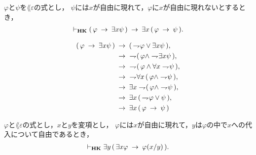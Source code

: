 	\begin{sketch}
		
	\end{sketch}
	
	\begin{screen}
		\begin{thm}
			$\varphi$と$\psi$を$\lang{\varepsilon}$の式とし，
			$\psi$には$x$が自由に現れて，$\varphi$に$x$が自由に現れないとするとき，
			\begin{align}
				\vdash_{{\scriptsize \mbox{{\bf HK}}}} (\, \varphi \hspace{0.25em}\rightarrow\hspace{0.25em} \exists x \psi\, )
				\hspace{0.25em}\rightarrow\hspace{0.25em} \exists x\, (\, \varphi \hspace{0.25em}\rightarrow\hspace{0.25em} \psi\, ).
			\end{align}
		\end{thm}
	\end{screen}
	
	\begin{sketch}
		\begin{align}
			(\, \varphi \rarrow \exists x \psi\, ) &\rarrow 
				(\, \negation \varphi \vee \exists x \psi\, ), \\
			&\rarrow\ \negation (\, \varphi \wedge \negation \exists x \psi\, ), \\
			&\rarrow\ \negation (\, \varphi \wedge \forall x \negation \psi\, ), \\
			&\rarrow\ \negation \forall x\, (\, \varphi \wedge \negation \psi\, ), \\
			&\rarrow \exists x \negation (\, \varphi \wedge \negation \psi\, ), \\
			&\rarrow \exists x\, (\, \negation \varphi \vee \psi\, ), \\
			&\rarrow \exists x\, (\, \varphi \rarrow \psi\, )
		\end{align}
	\end{sketch}
	
	
	\begin{screen}
		\begin{thm}
			$\varphi$と$\lang{\varepsilon}$の式とし，$x$と$y$を変項とし，
			$\varphi$には$x$が自由に現れて，$y$は$\varphi$の中で$x$への代入について自由であるとき，
			\begin{align}
				\vdash_{{\scriptsize \mbox{{\bf HK}}}} \exists y\, (\, \exists x \varphi \hspace{0.25em}\rightarrow\hspace{0.25em} \varphi(x/y)\, ).
			\end{align}
		\end{thm}
	\end{screen}
	